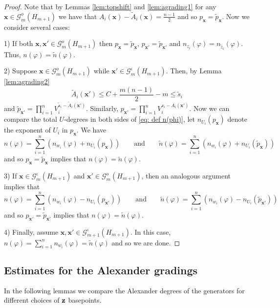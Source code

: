\documentclass{amsart}
\newcommand{\G}{\mathcal{G}}
\newcommand{\x}{\mathbf{x}}
\def\z{{\bf{z}}}
\def\x{\mathbf{x}}
\begin{document}
\begin{proof}
Note that by Lemmas \ref{lem:topshift} and \ref{lem:agrading1} for any $\x\in\G^o_{m}(H_{m+1})$ we have that 
 $A_i(\x)-\widetilde{A}_i(\x)=\frac{n-1}{2}$ and so $p_{\x}=\widetilde{p}_{\x}$. Now we consider several cases:

1) If both $\x,\x'\in\G^o_{m}(H_{m+1})$ then $p_{\x}=\widetilde{p}_{\x}$,  $p_{\x'}=\widetilde{p}_{\x'}$ and $n_{z_i}(\varphi)=n_{\widetilde{z}_i}(\varphi)$. Thus, $n(\varphi)=\widetilde{n}(\varphi)$. 

2) Suppose $\x\in\G^{o}_{m}(H_{m+1})$ while $\x'\in \G^{\iota}_{m}(H_{m+1})$. Then, by Lemma \ref{lem:agrading2} 
\[\widetilde{A}_i(\x')\le C+\frac{m(n-1)}{2}-m\le \widetilde{s}_i\]
and $\widetilde{p}_{\x'}=\prod_{i=1}^nV_i^{\widetilde{s}_i-\widetilde{A}_i(\x')}$. Similarly, $p_{\x'}=\prod_{i=1}^nV_i^{s_i-A_i(\x')}$.
Now we can compare the total $U$-degrees in both sides of \eqref{eq: def n(phi)}, let $n_{U_i}(p_{\x})$ denote the exponent of $U_i$ in $p_{\x}$.
We have
$$
n(\varphi)=\sum_{i=1}^n(n_{w_i}(\varphi)+n_{U_i}(p_{\x}))\quad\quad\text{and}\quad\quad\widetilde{n}(\varphi)=\sum_{i=1}^n(n_{w_i}(\varphi)+n_{U_i}(\widetilde{p}_{\x}))
$$
and so $p_{\x}=\widetilde{p}_{\x}$ implies that $n(\varphi)=\widetilde{n}(\varphi)$.


3) If $\x\in\G^{\iota}_{m}(H_{m+1})$ and $\x'\in\G^{o}_{m}(H_{m+1})$, then an analogous argument implies that
\[n(\varphi)=\sum_{i=1}^n(n_{w_i}(\varphi)-n_{U_i}(p_{\x'}))\quad\quad\text{and}\quad\quad \widetilde{n}(\varphi)=\sum_{i=1}^n(n_{w_i}(\varphi)-n_{U_i}(\widetilde{p}_{\x'}))\]
and so $p_{\x'}=\widetilde{p}_{\x'}$ implies  that $n(\varphi)=\widetilde{n}(\varphi)$.


4) Finally, assume $\x,\x'\in\mathcal{G}_{m+1}^{\iota}(H_{m+1})$. In this case, $n(\varphi)=\sum_{i=1}^nn_{w_i}(\varphi)=\widetilde{n}(\varphi)$ and so we are done.




\end{proof}


\subsection{Estimates for the Alexander gradings}


 
In the following lemmas we  compare the Alexander degrees of the generators for different choices of $\z$ basepoints.  
 
\end{document}
